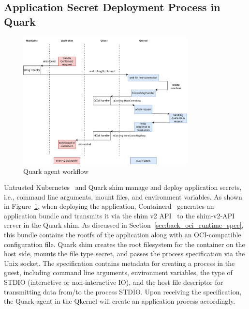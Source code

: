 \subsection{Application Secret Deployment Process in Quark}
\label{sec:security_analyse_secret_deployment}
\begin{figure}[htp]
    \centering
    \includegraphics[width=0.8\textwidth]{images/quark-agent-work-flow.png}
    \caption[Quark Agent Workflow]{Quark agent workflow}
    \label{fig:quark_agent_work_flow}
\end{figure}


Untrusted Kubernetes~\cite*{k8s} and Quark shim manage and deploy application secrets, i.e., command line arguments, mount files, and environment variables. As shown in Figure~\ref{fig:quark_agent_work_flow}, when deploying the application, Containerd~\cite*{containerd} generates an application bundle and transmits it via the shim v2 API~\cite*{shim_v2} to the shim-v2-API server in the Quark shim. 
As discussed in Section~\ref{sec:back_oci_runtime_spec}, this bundle contains the rootfs of the application along with an OCI-compatible configuration file. Quark shim creates the root filesystem for the container on the host side, mounts the file type secret, and passes the process specification via the Unix socket. The specification contains metadata for creating a process in the guest, including command line 
arguments, environment variables, the type of STDIO (interactive or non-interactive IO), and the host file descriptor for transmitting data from/to the process STDIO. Upon receiving the specification, the Quark agent in the Qkernel will create an application process accordingly.


